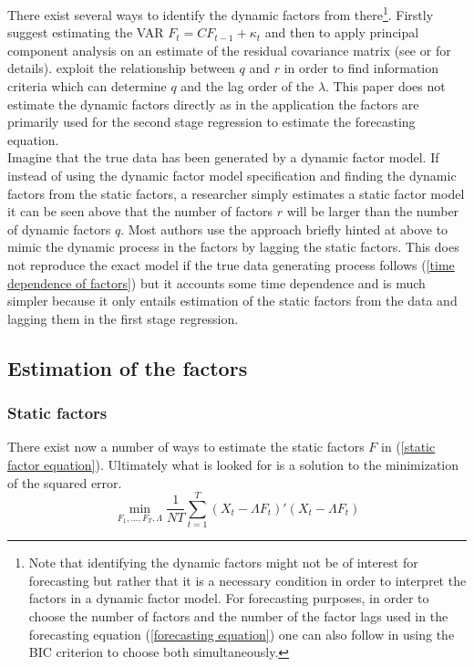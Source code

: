 \documentclass[12pt]{article}
\begin{document}
There exist several ways to identify the dynamic factors from there\footnote{Note that identifying the dynamic factors might not be of interest for forecasting but rather that it is a necessary condition in order to interpret the factors in a dynamic factor model. For forecasting purposes, in order to choose the number of factors and the number of the factor lags used in the forecasting equation (\ref{forecasting equation}) one can also follow \citet{bai2008forecasting} in using the BIC criterion to choose both simultaneously. }. Firstly \citet{giannone2002tracking} suggest estimating the VAR $F_t = C F_{t-1} + \kappa_t$ and then to apply principal component analysis on an estimate of the residual covariance matrix (see \citet{breitung2004identification} or \citet{giannone2002tracking} for details). \citet{breitung2004identification} exploit the relationship between $q$ and $r$ in order to find information criteria which can determine $q$ and the lag order of the $\lambda$. This paper does not estimate the dynamic factors directly as in the application the factors are primarily used for the second stage regression to estimate the forecasting equation. \\

Imagine that the true data has been generated by a dynamic factor model. If instead of using the dynamic factor model specification and finding the dynamic factors from the static factors, a researcher simply estimates a static factor model it can be seen above that the number of factors $r$ will be larger than the number of dynamic factors $q$. Most authors use the approach briefly hinted at above to mimic the dynamic process in the factors by lagging the static factors. This does not reproduce the exact model if the true data generating process follows (\ref{time dependence of factors}) but it accounts some time dependence and is much simpler because it only entails estimation of the static factors from the data and lagging them in the first stage regression.

\subsection{Estimation of the factors}
\subsubsection{Static factors}
There exist now a number of ways to estimate the static factors $F$ in (\ref{static factor equation}). Ultimately what is looked for is a solution to the minimization of the squared error.
\begin{equation}
	\label{factor equation minimization problem}
	\min_{F_1, ..., F_T, \Lambda} \frac{1}{NT} \sum_{t=1}^T (X_t - \Lambda F_t)'(X_t - \Lambda F_t)
\end{equation}
\end{document}
